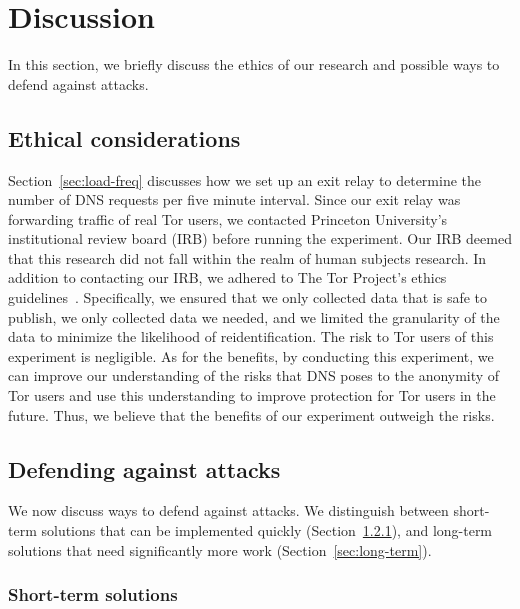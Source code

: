 \section{Discussion}
\label{sec:discussion}

In this section, we briefly discuss the ethics of our research and
possible ways to defend against \name attacks.

\subsection{Ethical considerations}
\label{sec:ethics}

Section~\ref{sec:load-freq} discusses how we set up an exit relay to
determine the number of DNS requests per five minute interval.  Since
our exit relay was forwarding traffic of real Tor users, we contacted Princeton
University's institutional review board (IRB) before running the
experiment.  Our IRB deemed that this research did not fall within the
realm of human subjects research.  In addition to contacting our IRB, we
adhered to The Tor Project's ethics guidelines~\cite{ethics-guidelines}.
Specifically, \first we ensured that we only collected data that is safe
to publish, \second we only collected data we needed, and \third we
limited the granularity of the data to minimize the likelihood of
reidentification.  The risk to Tor users of this experiment is negligible.
As for the benefits, by conducting this experiment, we can improve our
understanding of the risks that DNS poses to the anonymity of Tor users
and use this understanding to improve protection for Tor users in the
future.
Thus, we believe that the benefits of our experiment outweigh the risks.

\subsection{Defending against \name attacks}

We now discuss ways to defend against \name attacks.  We distinguish
between short-term solutions that can be implemented quickly
(Section~\ref{sec:short-term}), and long-term solutions that need significantly
more work (Section~\ref{sec:long-term}).

\subsubsection{Short-term solutions}
\label{sec:short-term}

